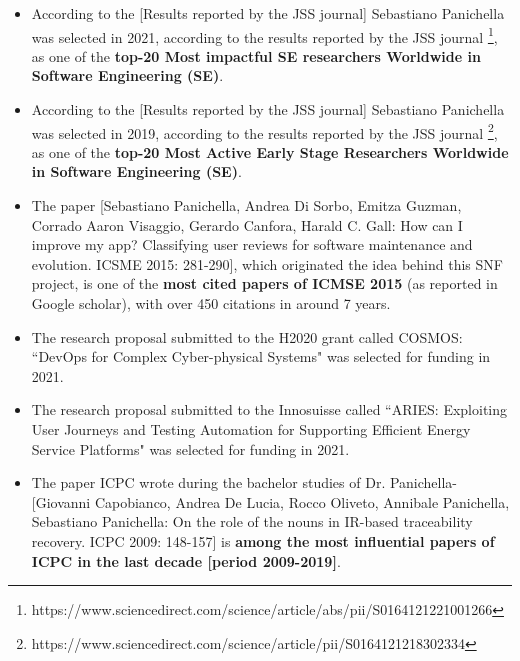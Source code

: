 \documentclass[10pt]{article}
\begin{document}
\vspace{-2.5mm}
\begin{itemize}
  \item According to the [Results reported by the JSS journal] Sebastiano Panichella was selected in 2021, according to the results reported by the JSS journal \footnote{https://www.sciencedirect.com/science/article/abs/pii/S0164121221001266}, as one of the \textbf{top-20 Most impactful SE researchers Worldwide in Software Engineering (SE)}. 
  \item According to the [Results reported by the JSS journal] Sebastiano Panichella was selected in 2019, according to the results reported by the JSS journal \footnote{https://www.sciencedirect.com/science/article/pii/S0164121218302334}, as one of the \textbf{top-20 Most Active Early Stage Researchers Worldwide in Software Engineering (SE)}. 
\vspace{-1.5mm}
  \item The paper [Sebastiano Panichella, Andrea Di Sorbo, Emitza Guzman, Corrado Aaron Visaggio, Gerardo Canfora, Harald C. Gall: How can I improve my app? Classifying user reviews for software maintenance and evolution. ICSME 2015: 281-290], which originated the idea behind this SNF project, is one of the \textbf{most cited papers of ICMSE 2015} (as reported in Google scholar), with over 450 citations in around 7 years.
  \item The research proposal submitted to the H2020 grant called COSMOS: ``DevOps for Complex Cyber-physical Systems" was selected for funding in 2021.
  \item The research proposal submitted to the Innosuisse called ``ARIES: Exploiting User Journeys and Testing Automation for Supporting Efficient Energy Service Platforms" was selected for funding in 2021.
\vspace{-1.5mm}
  \item The paper ICPC wrote during the bachelor studies of Dr. Panichella-[Giovanni Capobianco, Andrea De Lucia, Rocco Oliveto, Annibale Panichella, Sebastiano Panichella: On the role of the nouns in IR-based traceability recovery. ICPC 2009: 148-157] is \textbf{among the most influential papers of ICPC in the last decade [period 2009-2019]}.
  \vspace{-1.5mm}
\end{itemize}
\end{document}
